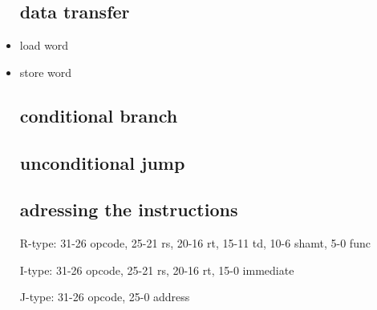 \documentclass[10pt]{article}
\begin{document}
\begin{itemize}
\subsection{data transfer}
\item load word \\
\item store word \\

\subsection{conditional branch}

\subsection{unconditional jump}	

\subsection{adressing the instructions}
\item[R-type:] 31-26 opcode, 25-21 rs, 20-16 rt, 15-11 td, 10-6 shamt, 5-0 func\\
\item[I-type:] 31-26 opcode, 25-21 rs, 20-16 rt, 15-0 immediate\\
\item[J-type:] 31-26 opcode, 25-0 address
	  
	
\end{itemize}
\end{document}
